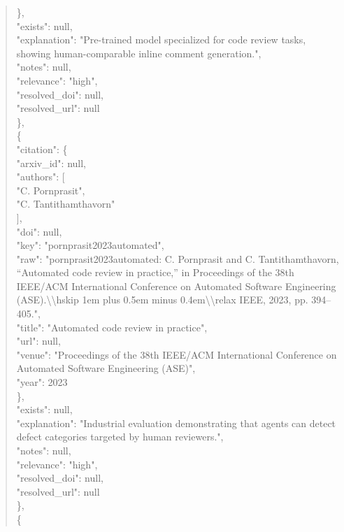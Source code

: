 \documentclass[11pt]{article}
\begin{document}
\begin{quote}
      \},\\
      "exists": null,\\
      "explanation": "Pre-trained model specialized for code review tasks, showing human-comparable inline comment generation.",\\
      "notes": null,\\
      "relevance": "high",\\
      "resolved\_doi": null,\\
      "resolved\_url": null\\
    \},\\
    \{\\
      "citation": \{\\
        "arxiv\_id": null,\\
        "authors": [\\
          "C. Pornprasit",\\
          "C. Tantithamthavorn"\\
        ],\\
        "doi": null,\\
        "key": "pornprasit2023automated",\\
        "raw": "pornprasit2023automated: C. Pornprasit and C. Tantithamthavorn, ``Automated code review in practice,'' in Proceedings of the 38th IEEE/ACM International Conference on Automated Software Engineering (ASE).\textbackslash{}\textbackslash{}hskip 1em plus 0.5em minus 0.4em\textbackslash{}\textbackslash{}relax IEEE, 2023, pp. 394--405.",\\
        "title": "Automated code review in practice",\\
        "url": null,\\
        "venue": "Proceedings of the 38th IEEE/ACM International Conference on Automated Software Engineering (ASE)",\\
        "year": 2023\\
      \},\\
      "exists": null,\\
      "explanation": "Industrial evaluation demonstrating that agents can detect defect categories targeted by human reviewers.",\\
      "notes": null,\\
      "relevance": "high",\\
      "resolved\_doi": null,\\
      "resolved\_url": null\\
    \},\\
    \{\\

\end{quote}
\end{document}
